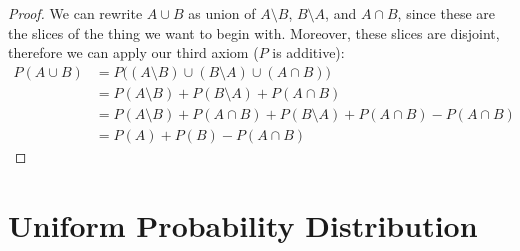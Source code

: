 \begin{proof}
    We can rewrite $A \cup B$ as union of $A \setminus B$, $B \setminus A$, and $A \cap B$, since these are the slices of the thing we want to begin with. Moreover, these slices are disjoint, therefore we can apply our third axiom ($P$ is additive):
$$ 
\begin{aligned} 
    P \left(A \cup B\right) &= P \bigl( (A \setminus B) \cup (B \setminus A) \cup (A \cap B) \bigr) \\
                            &= P(A \setminus B) + P( B \setminus A) + P(A \cap B)  \\
                            &= P(A \setminus B) + P( A \cap B)+ P( B \setminus A) + P(A \cap B) - P(A \cap B)  \\
                            &= P(A)+P(B)-P(A \cap B) 
\end{aligned}
$$ 
\end{proof}



\section{Uniform Probability Distribution}